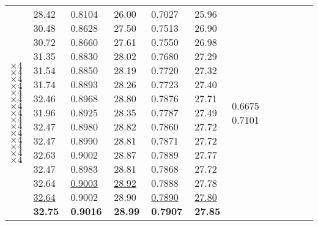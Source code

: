 \documentclass[runningheads]{llncs}
\begin{document}
\begin{table}[!ht]
\begin{tabular}{|p{7em}|p{2.5em}|p{2.5em}|p{3em}|p{2.5em}|p{3em}|p{2.5em}|p{3em}|p{2.5em}|p{3em}|p{2.5em}|p{3em}|}
		$\times4$ \newline{}$\times4$ \newline{}$\times4$ \newline{}$\times4$ \newline{}$\times4$ \newline{}$\times4$ \newline{}$\times4$ \newline{}$\times4$ \newline{}$\times4$ \newline{}$\times4$ \newline{}$\times4$ \newline{}$\times4$ \newline{}$\times4$ \newline{}$\times4$ \newline{}$\times4$  & 28.42 \newline{}30.48 \newline{}30.72 \newline{}31.35 \newline{}31.54 \newline{}31.74 \newline{}32.46 \newline{}31.96 \newline{}32.47 \newline{}32.47 \newline{}32.63 \newline{}32.47 \newline{}32.64 \newline{}\underline{32.64} \newline{}\bfseries{32.75} & 0.8104 \newline{}0.8628 \newline{}0.8660 \newline{}0.8830 \newline{}0.8850 \newline{}0.8893 \newline{}0.8968 \newline{}0.8925 \newline{}0.8980 \newline{}0.8990 \newline{}0.9002 \newline{}0.8983 \newline{}\underline{0.9003} \newline{}0.9002 \newline{}\bfseries{0.9016} & 26.00 \newline{}27.50 \newline{}27.61 \newline{}28.02 \newline{}28.19 \newline{}28.26 \newline{}28.80 \newline{}28.35 \newline{}28.82 \newline{}28.81 \newline{}28.87 \newline{}28.81 \newline{}\underline{28.92} \newline{}28.90 \newline{}\bfseries{28.99} & 0.7027 \newline{}0.7513 \newline{}0.7550 \newline{}0.7680 \newline{}0.7720 \newline{}0.7723 \newline{}0.7876 \newline{}0.7787 \newline{}0.7860 \newline{}0.7871 \newline{}0.7889 \newline{}0.7868 \newline{}0.7888 \newline{}\underline{0.7890} \newline{}\bfseries{0.7907} & 25.96 \newline{}26.90 \newline{}26.98 \newline{}27.29 \newline{}27.32 \newline{}27.40 \newline{}27.71 \newline{}27.49 \newline{}27.72 \newline{}27.72 \newline{}27.77 \newline{}27.72 \newline{}27.78 \newline{}\underline{27.80} \newline{}\bfseries{27.85} & 0.6675 \newline{}0.7101 \newline{
\end{tabular}
\end{table}
\end{document}
